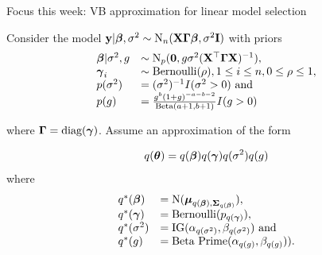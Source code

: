 \documentclass{beamer}
\begin{document}
\def\vGamma{{\boldsymbol{\Gamma}}}
\begin{frame}{Focus this week: VB approximation for linear model selection}

Consider the model $\vy | \vbeta, \sigma^2 \sim \text{N}_n(\mX \vGamma \vbeta, \sigma^2 \mI)$ 
with priors
\begin{equation*}
\begin{array}{ll}
\vbeta | \sigma^2, g &\sim \text{N}_p(\vzero, g \sigma^2(\mX^\top \vGamma \mX)^{-1}), \\
\vgamma_i &\sim \text{Bernoulli}(\rho), 1 \leq i \leq n, 0 \leq \rho \leq 1, \\
p(\sigma^2) &= (\sigma^2)^{-1} I(\sigma^2 > 0) \text{ and }\\
p(g) &= \frac{g^b (1 + g)^{-a - b - 2}}{\text{Beta}(a + 1, b + 1)} I(g > 0)
\end{array}
\end{equation*}

where $\vGamma = \diag (\vgamma)$. Assume an approximation of the form

\begin{equation*}
q({\boldsymbol \theta}) = q({\boldsymbol \beta}) q({\boldsymbol \gamma}) q(\sigma^2) q(g)
\end{equation*}
where
\begin{equation*}
\begin{array}{ll}
q^*({\boldsymbol \beta}) &= \text{N}({\boldsymbol \mu}_{q({\boldsymbol \beta}), {\boldsymbol \Sigma}_{q({\boldsymbol \beta})}}), \\
q^*({\boldsymbol \gamma}) &= \text{Bernoulli}(p_{q({\boldsymbol \gamma})}), \\
q^*(\sigma^2) &= \text{IG}(\alpha_{q(\sigma^2)}, \beta_{q(\sigma^2)}) \text{ and } \\
q^*(g) &= \text{Beta Prime}(\alpha_{q(g)}, \beta_{q(g)})). \\
\end{array}
\end{equation*}
\end{frame}
\end{document}
